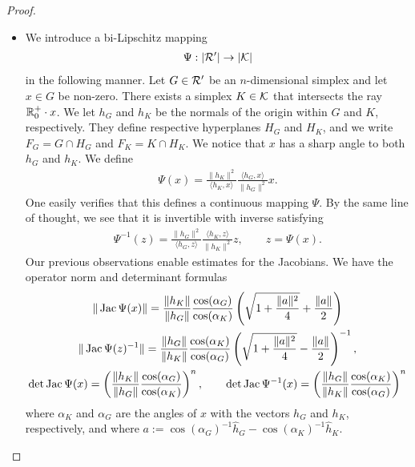 \documentclass[10pt,letterpaper]{article}
\begin{document}
\begin{proof}
\begin{itemize}
        \item 
        We introduce a bi-Lipschitz mapping 
        \begin{align*}
            \Psi : |{\mathcal R}'| \rightarrow |{\mathcal K}|
        \end{align*}
        in the following manner. Let ${G} \in {\mathcal R}'$ be an $n$-dimensional simplex and let $x \in {G}$ be non-zero. There exists a simplex $K \in {\mathcal K}$ that intersects the ray ${\mathbb R}_0^+ \cdot x$. We let $h_{{G}}$ and $h_{K}$ be the normals of the origin within ${G}$ and $K$, respectively. They define respective hyperplanes $H_{G}$ and $H_{K}$,
        and we write $F_{G} = G \cap H_{G}$ and $F_{K} = K \cap H_{K}$. 
        We notice that $x$ has a sharp angle to both $h_{{G}}$ and $h_{K}$. 
        We define 
        \begin{align*}
            \Psi(x) 
            = 
            \frac{ \| h_K \|^{2} }{ \langle h_K, x \rangle }
            \frac{ \langle h_{{G}}, x \rangle }{ \| h_{{G}} \|^{2} }
            x
            .
        \end{align*}
        One easily verifies that this defines a continuous mapping $\Psi$. 
        By the same line of thought, we see that it is invertible with inverse satisfying 
        \begin{align*}
            \Psi^{-1}(z) 
            = 
            \frac{ \| h_{{G}} \|^{2} }{ \langle h_{{G}}, z \rangle }
            \frac{ \langle h_K, z \rangle }{ \| h_K \|^{2} }
            z,
            \qquad 
            z = \Psi(x)
            .
        \end{align*}
        Our previous observations enable estimates for the Jacobians. 
        We have the operator norm and determinant formulas 
        \begin{gather*}
            \| \operatorname{{\rm Jac}}\Psi(x) \|
            = 
            \frac{ \| h_K \| }{ \| h_{{G}} \| }
            \frac{ \cos(\alpha_{{G}}) }{ \cos(\alpha_K) }
            \left( 
                \sqrt{ 1 + \frac{ \|a\|^{2} }{ 4 } } + \frac{ \|a\| }{2}
            \right)
            \\
            \| \operatorname{{\rm Jac}}\Psi(z)^{-1} \|
            = 
            \frac{ \| h_{{G}} \| }{ \| h_K \| }
            \frac{ \cos(\alpha_K) }{ \cos(\alpha_{{G}}) }
            \left( 
                \sqrt{ 1 + \frac{ \|a\|^{2} }{ 4 } } - \frac{ \|a\| }{2}
            \right)^{-1},
            \\
            \det\operatorname{{\rm Jac}}\Psi(x)
            =
            \left( 
            \frac{ \| h_K \| }{ \| h_{{G}} \| }
            \frac{ \cos(\alpha_{{G}}) }{ \cos(\alpha_K) }
            \right)^{n},
            \qquad
            \det\operatorname{{\rm Jac}}\Psi^{-1}(x)
            =
            \left( 
            \frac{ \| h_{{G}} \| }{ \| h_{K} \| }
            \frac{ \cos(\alpha_{K}) }{ \cos(\alpha_{{G}}) }
            \right)^{n}
        \end{gather*}
        where $\alpha_K$ and $\alpha_{{G}}$ are the angles of $x$ with the vectors $h_{{G}}$ and $h_{K}$, respectively,
        and where $a := \cos(\alpha_{{G}})^{-1} \hat h_{{G}} - \cos(\alpha_K)^{-1} \hat h_K$. 
        

\end{itemize}
\end{proof}
\end{document}
